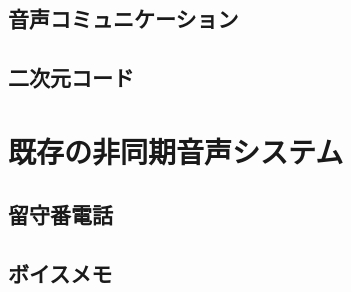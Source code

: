 \documentclass[submit,techrep,noauthor]{ipsj}
\def\|{\verb|}
\begin{document}
% \begin{enumerate}
% \item \|ipsj.cls      |: 最終原稿用スタイルファイル

\subsection{音声コミュニケーション}


\subsection{二次元コード}

\section{既存の非同期音声システム}



\subsection{留守番電話}

\subsection{ボイスメモ}
\end{document}
